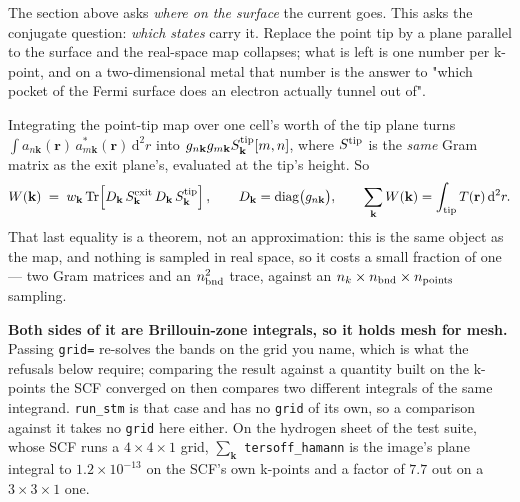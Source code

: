 \documentclass[11pt,a4paper]{article}
\newcommand{\code}[1]{\texttt{\small #1}}
\begin{document}
The section above asks \emph{where on the surface} the current goes. This asks
the conjugate question: \emph{which states} carry it. Replace the point tip by a
plane parallel to the surface and the real-space map collapses; what is left is
one number per k-point, and on a two-dimensional metal that number is the
answer to "which pocket of the Fermi surface does an electron actually tunnel
out of".

Integrating the point-tip map over one cell's worth of the tip plane turns
$\int a_{n\mathbf k}(\mathbf r)\, a^{*}_{m\mathbf k}(\mathbf r)\,\mathrm d^2 r$
into $g_{n\mathbf k} g_{m\mathbf k} S^{\rm tip}_{\mathbf k}[m,n]$, where
$S^{\rm tip}$ is the \emph{same} Gram matrix as the exit plane's, evaluated at
the tip's height. So
\begin{equation*}
  W(\mathbf k) \;=\; w_{\mathbf k}\,
    \mathrm{Tr}\!\left[ D_{\mathbf k}\, S^{\rm exit}_{\mathbf k}\,
                        D_{\mathbf k}\, S^{\rm tip}_{\mathbf k} \right],
  \qquad D_{\mathbf k} = \mathrm{diag}\bigl(g_{n\mathbf k}\bigr),
  \qquad \sum_{\mathbf k} W(\mathbf k) = \int_{\rm tip} T(\mathbf r)\,\mathrm d^2 r .
\end{equation*}
That last equality is a theorem, not an approximation: this is the same object
as the map, and nothing is sampled in real space, so it costs a small fraction
of one --- two Gram matrices and an $n_{\rm bnd}^2$ trace, against an
$n_k \times n_{\rm bnd} \times n_{\rm points}$ sampling.

\textbf{Both sides of it are Brillouin-zone integrals, so it holds mesh for
mesh.} Passing \code{grid=} re-solves the bands on the grid you name, which is
what the refusals below require; comparing the result against a quantity built
on the k-points the SCF converged on then compares two different integrals of
the same integrand. \code{run\_stm} is that case and has no \code{grid} of its
own, so a comparison against it takes no \code{grid} here either. On the
hydrogen sheet of the test suite, whose SCF runs a $4\times4\times1$ grid,
$\sum_{\mathbf k}$ \code{tersoff\_hamann} is the image's plane integral to
$1.2\times10^{-13}$ on the SCF's own k-points and a factor of $7.7$ out on a
$3\times3\times1$ one.
\end{document}
